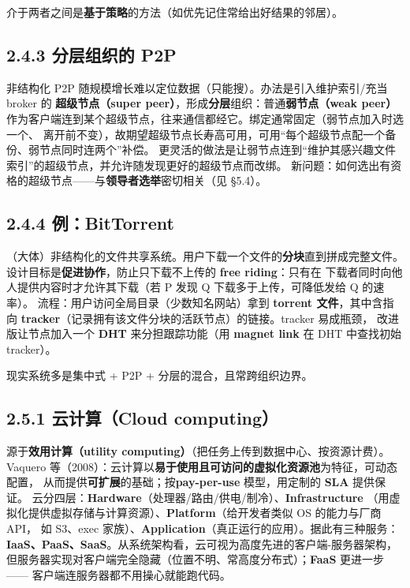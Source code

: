 \noindent 介于两者之间是\textbf{基于策略}的方法（如优先记住常给出好结果的邻居）。

\subsection*{2.4.3 分层组织的 P2P}
非结构化 P2P 随规模增长难以定位数据（只能搜）。办法是引入维护索引/充当 broker 的
\textbf{超级节点（super peer）}，形成\textbf{分层}组织：普通\textbf{弱节点（weak peer）}
作为客户端连到某个超级节点，往来通信都经它。绑定通常固定（弱节点加入时选一个、
离开前不变），故期望超级节点长寿高可用，可用“每个超级节点配一个备份、弱节点同时连两个”补偿。
更灵活的做法是让弱节点连到“维护其感兴趣文件索引”的超级节点，并允许随发现更好的超级节点而改绑。
新问题：如何选出有资格的超级节点——与\textbf{领导者选举}密切相关（见 §5.4）。

\subsection*{2.4.4 例：BitTorrent}
（大体）非结构化的文件共享系统。用户下载一个文件的\textbf{分块}直到拼成完整文件。
设计目标是\textbf{促进协作}，防止只下载不上传的 \textbf{free riding}：只有在
下载者同时向他人提供内容时才允许其下载（若 P 发现 Q 下载多于上传，可降低发给 Q 的速率）。
流程：用户访问全局目录（少数知名网站）拿到 \textbf{torrent 文件}，其中含指向
\textbf{tracker}（记录拥有该文件分块的活跃节点）的链接。tracker 易成瓶颈，
改进版让节点加入一个 \textbf{DHT} 来分担跟踪功能（用 \textbf{magnet link} 在 DHT 中查找初始 tracker）。

\begin{closeread}
\end{closeread}



现实系统多是集中式 + P2P + 分层的混合，且常跨组织边界。

\subsection*{2.5.1 云计算（Cloud computing）}
源于\textbf{效用计算（utility computing）}（把任务上传到数据中心、按资源计费）。
Vaquero 等（2008）：云计算以\textbf{易于使用且可访问的虚拟化资源池}为特征，可动态配置，
从而提供\textbf{可扩展}的基础；按\textbf{pay-per-use} 模型，用定制的 \textbf{SLA} 提供保证。
云分四层：\textbf{Hardware}（处理器/路由/供电/制冷）、\textbf{Infrastructure}
（用虚拟化提供虚拟存储与计算资源）、\textbf{Platform}（给开发者类似 OS 的能力与厂商 API，
如 S3、exec 家族）、\textbf{Application}（真正运行的应用）。据此有三种服务：
\textbf{IaaS、PaaS、SaaS}。从系统架构看，云可视为高度先进的客户端-服务器架构，
但服务器实现对客户端完全隐藏（位置不明、常高度分布式）；\textbf{FaaS} 更进一步——
客户端连服务器都不用操心就能跑代码。

